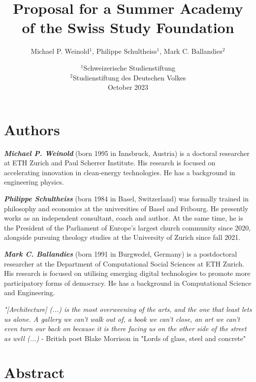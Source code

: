 \documentclass{article}
\title{Proposal for a Summer Academy \protect\\ of the Swiss Study Foundation}
\author{Michael P. Weinold$^1$, Philippe Schultheiss$^1$, Mark C. Ballandies$^2$}
\date{
    $^1$Schweizerische Studienstiftung \\
    $^2$Studienstiftung des Deutschen Volkes \\[3mm]
    October 2023
}
\begin{document}
\maketitle

\section*{\centering Authors}

\textbf{\textit{Michael P. Weinold}} (born 1995 in Innsbruck, Austria) is a doctoral researcher at ETH Zurich and Paul Scherrer Institute. His research is focused on accelerating innovation in clean-energy technologies. He has a  background in engineering physics.

\textbf{\textit{Philippe Schultheiss}} (born 1984 in Basel, Switzerland) was formally trained in philosophy and economics at the universities of Basel and Fribourg. He presently works as an independent consultant, coach and author. At the same time, he is the President of the Parliament of Europe's largest church community since 2020, alongside pursuing theology studies at the University of Zurich since fall 2021. 

\textbf{\textit{Mark C. Ballandies}} (born 1991 in Burgwedel, Germany) is a postdoctoral researcher at the Department of Computational Social Sciences at ETH Zurich. His research is focused on utilising emerging digital technologies to promote more participatory forms of democracy. He has a background in Computational Science and Engineering.

\textit{"[Architecture] (...) is the most overweening of the arts, and the one that least lets us alone. A gallery we can't walk out of, a book we can't close, an art we can't even turn our back on because it is there facing us on the other side of the street as well (...)} - British poet Blake Morrison in "Lords of glass, steel and concrete" \cite{morrison_lords_1982}

\clearpage
\tableofcontents

\section{\centering Abstract}
\end{document}
